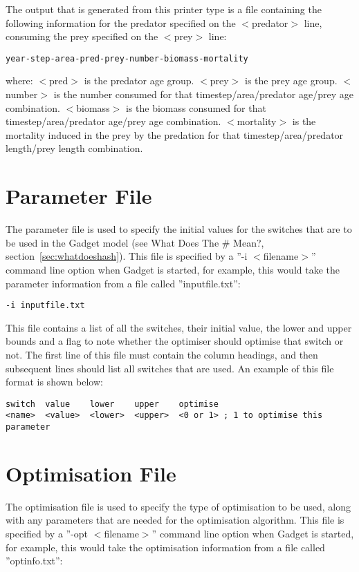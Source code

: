 \documentclass [a4paper, 10pt]{book}
\begin{document}
The output that is generated from this printer type is a file containing the following information for the predator specified on the $<$predator$>$ line, consuming the prey specified on the $<$prey$>$ line:

{\small\begin{verbatim}
year-step-area-pred-prey-number-biomass-mortality
\end{verbatim}}

where:\newline
$<$pred$>$ is the predator age group.\newline
$<$prey$>$ is the prey age group.\newline
$<$number$>$ is the number consumed for that timestep/area/predator age/prey age combination.\newline
$<$biomass$>$ is the biomass consumed for that timestep/area/predator age/prey age combination.\newline
$<$mortality$>$ is the mortality induced in the prey by the predation for that timestep/area/predator length/prey length combination.

\chapter{Parameter File}\label{chap:param}
The parameter file is used to specify the initial values for the switches that are to be used in the Gadget model (see What Does The \# Mean?, section~\ref{sec:whatdoeshash}).  This file is specified by a ''-i $<$filename$>$'' command line option when Gadget is started, for example, this would take the parameter information from a file called ''inputfile.txt'':

{\small\begin{verbatim}
-i inputfile.txt
\end{verbatim}}

This file contains a list of all the switches, their initial value, the lower and upper bounds and a flag to note whether the optimiser should optimise that switch or not.  The first line of this file must contain the column headings, and then subsequent lines should list all switches that are used.  An example of this file format is shown below:

{\small\begin{verbatim}
switch  value    lower    upper    optimise
<name>  <value>  <lower>  <upper>  <0 or 1> ; 1 to optimise this parameter
\end{verbatim}}

\chapter{Optimisation File}\label{chap:optim}
The optimisation file is used to specify the type of optimisation to be used, along with any parameters that are needed for the optimisation algorithm.  This file is specified by a ''-opt $<$filename$>$'' command line option when Gadget is started, for example, this would take the optimisation information from a file called ''optinfo.txt'':
\end{document}
